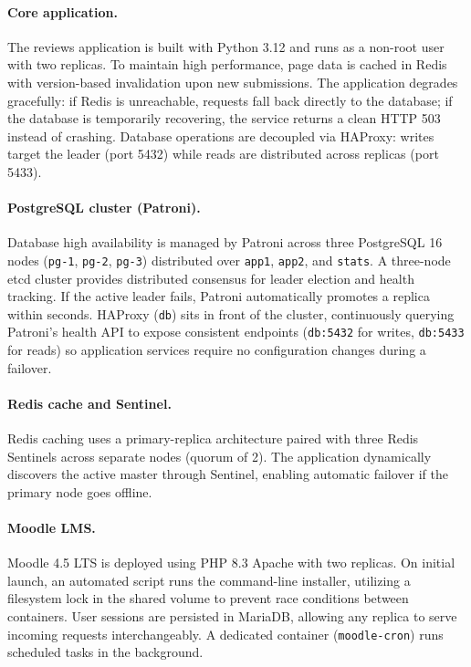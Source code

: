 \documentclass[11pt,a4paper]{article}
\newcommand{\svc}[1]{\texttt{#1}}
\begin{document}
\paragraph{Core application.} The reviews application is built with Python 3.12 and runs as a non-root user with two replicas. To maintain high performance, page data is cached in Redis with version-based invalidation upon new submissions. The application degrades gracefully: if Redis is unreachable, requests fall back directly to the database; if the database is temporarily recovering, the service returns a clean HTTP 503 instead of crashing. Database operations are decoupled via HAProxy: writes target the leader (port 5432) while reads are distributed across replicas (port 5433).

\paragraph{PostgreSQL cluster (Patroni).} Database high availability is managed by Patroni across three PostgreSQL 16 nodes (\svc{pg-1}, \svc{pg-2}, \svc{pg-3}) distributed over \texttt{app1}, \texttt{app2}, and \texttt{stats}. A three-node etcd cluster provides distributed consensus for leader election and health tracking. If the active leader fails, Patroni automatically promotes a replica within seconds. HAProxy (\svc{db}) sits in front of the cluster, continuously querying Patroni's health API to expose consistent endpoints (\texttt{db:5432} for writes, \texttt{db:5433} for reads) so application services require no configuration changes during a failover.

\paragraph{Redis cache and Sentinel.} Redis caching uses a primary-replica architecture paired with three Redis Sentinels across separate nodes (quorum of 2). The application dynamically discovers the active master through Sentinel, enabling automatic failover if the primary node goes offline.

\paragraph{Moodle LMS.} Moodle 4.5 LTS is deployed using PHP 8.3 Apache with two replicas. On initial launch, an automated script runs the command-line installer, utilizing a filesystem lock in the shared volume to prevent race conditions between containers. User sessions are persisted in MariaDB, allowing any replica to serve incoming requests interchangeably. A dedicated container (\svc{moodle-cron}) runs scheduled tasks in the background.
\end{document}

